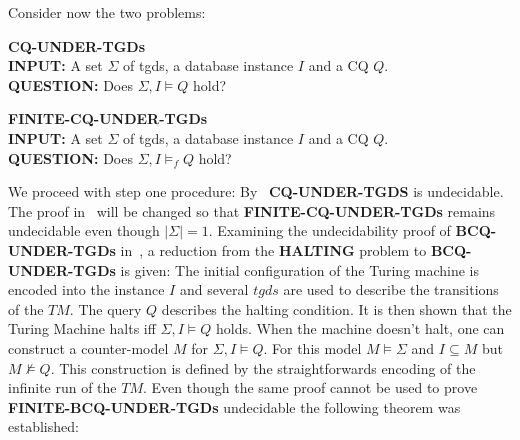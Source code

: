 Consider now the two problems:
\begin{framed}\noindent \textbf{CQ-UNDER-TGDs}\\
	\textbf{INPUT:} A set $\Sigma$ of tgds, a database instance $I$ and a CQ $Q$.\\
	\textbf{QUESTION:} Does $\Sigma, I\models Q$ hold? 
\end{framed}
\begin{framed}\noindent \textbf{FINITE-CQ-UNDER-TGDs}\\
	\textbf{INPUT:} A set $\Sigma$ of tgds, a database instance $I$ and a CQ $Q$.\\
	\textbf{QUESTION:} Does $\Sigma, I\models_f Q$ hold? 
\end{framed}
We proceed with step one procedure:
By~\cite{cali2008taming} \textbf{CQ-UNDER-TGDS} is undecidable. The proof
in~\cite{cali2008taming} will be changed so that
\textbf{FINITE-CQ-UNDER-TGDs} remains
undecidable even though $|\Sigma| = 1$.
Examining the undecidability proof of \textbf{BCQ-UNDER-TGDs} in~\cite{cali2008taming}, 
a reduction from the \textbf{HALTING} problem to \textbf{BCQ-UNDER-TGDs} is given: The
initial configuration of the Turing machine is encoded into the instance $I$ and
several $tgds$ are used to describe the transitions of the $TM$. The query $Q$
describes the halting condition.
It is then shown that the Turing Machine halts iff $\Sigma,I \models Q$ holds.
When the machine doesn't halt, one can construct a counter-model $M$ for
$\Sigma,I \models Q$. For this model $M \models \Sigma$ and $I \subseteq M$ but
$M \not \models Q$. This construction is defined by the straightforwards
encoding of the infinite run of the $TM$. 
%
Even though the same proof cannot be used to prove \textbf{FINITE-BCQ-UNDER-TGDs} undecidable
the following theorem was established:

